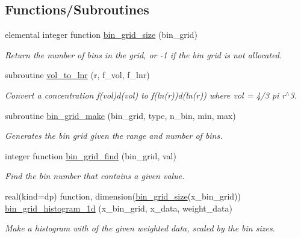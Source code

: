 \subsection*{Functions/\+Subroutines}
\begin{DoxyCompactItemize}
\item 
elemental integer function \mbox{\hyperlink{namespacepmc__bin__grid_add81887392bce2b981cecd3cfe553a5f}{bin\+\_\+grid\+\_\+size}} (bin\+\_\+grid)
\begin{DoxyCompactList}\small\item\em Return the number of bins in the grid, or -\/1 if the bin grid is not allocated. \end{DoxyCompactList}\item 
subroutine \mbox{\hyperlink{namespacepmc__bin__grid_abc23e1f905843cf09accd4dc7275ab5b}{vol\+\_\+to\+\_\+lnr}} (r, f\+\_\+vol, f\+\_\+lnr)
\begin{DoxyCompactList}\small\item\em Convert a concentration f(vol)d(vol) to f(ln(r))d(ln(r)) where vol = 4/3 pi r$^\wedge$3. \end{DoxyCompactList}\item 
subroutine \mbox{\hyperlink{namespacepmc__bin__grid_a32e33f03578d23808536c09a6211a286}{bin\+\_\+grid\+\_\+make}} (bin\+\_\+grid, type, n\+\_\+bin, min, max)
\begin{DoxyCompactList}\small\item\em Generates the bin grid given the range and number of bins. \end{DoxyCompactList}\item 
integer function \mbox{\hyperlink{namespacepmc__bin__grid_a132c58d7b2762a65c43ede00ef90d41d}{bin\+\_\+grid\+\_\+find}} (bin\+\_\+grid, val)
\begin{DoxyCompactList}\small\item\em Find the bin number that contains a given value. \end{DoxyCompactList}\item 
real(kind=dp) function, dimension(\mbox{\hyperlink{namespacepmc__bin__grid_add81887392bce2b981cecd3cfe553a5f}{bin\+\_\+grid\+\_\+size}}(x\+\_\+bin\+\_\+grid)) \mbox{\hyperlink{namespacepmc__bin__grid_a89431948ddfba118694e7ef50b09d32b}{bin\+\_\+grid\+\_\+histogram\+\_\+1d}} (x\+\_\+bin\+\_\+grid, x\+\_\+data, weight\+\_\+data)
\begin{DoxyCompactList}\small\item\em Make a histogram with of the given weighted data, scaled by the bin sizes. \end{DoxyCompactList}\item 

\end{DoxyCompactItemize}
